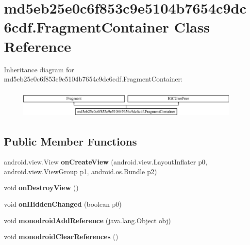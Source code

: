 \hypertarget{classmd5eb25e0c6f853c9e5104b7654c9dc6cdf_1_1FragmentContainer}{}\section{md5eb25e0c6f853c9e5104b7654c9dc6cdf.\+Fragment\+Container Class Reference}
\label{classmd5eb25e0c6f853c9e5104b7654c9dc6cdf_1_1FragmentContainer}
Inheritance diagram for md5eb25e0c6f853c9e5104b7654c9dc6cdf.\+Fragment\+Container\+:\begin{figure}[H]
\begin{center}
\leavevmode
\includegraphics[height=1.501341cm]{classmd5eb25e0c6f853c9e5104b7654c9dc6cdf_1_1FragmentContainer}
\end{center}
\end{figure}
\subsection*{Public Member Functions}
\begin{DoxyCompactItemize}
\item 
\hypertarget{classmd5eb25e0c6f853c9e5104b7654c9dc6cdf_1_1FragmentContainer_aba67b66f09672598a2d64e86fc2c267d}{}android.\+view.\+View {\bfseries on\+Create\+View} (android.\+view.\+Layout\+Inflater p0, android.\+view.\+View\+Group p1, android.\+os.\+Bundle p2)\label{classmd5eb25e0c6f853c9e5104b7654c9dc6cdf_1_1FragmentContainer_aba67b66f09672598a2d64e86fc2c267d}

\item 
\hypertarget{classmd5eb25e0c6f853c9e5104b7654c9dc6cdf_1_1FragmentContainer_a28fd8cf58a344f6c5c6990f47f105083}{}void {\bfseries on\+Destroy\+View} ()\label{classmd5eb25e0c6f853c9e5104b7654c9dc6cdf_1_1FragmentContainer_a28fd8cf58a344f6c5c6990f47f105083}

\item 
\hypertarget{classmd5eb25e0c6f853c9e5104b7654c9dc6cdf_1_1FragmentContainer_a66bcdccabab4d6f28038fc5259afd02e}{}void {\bfseries on\+Hidden\+Changed} (boolean p0)\label{classmd5eb25e0c6f853c9e5104b7654c9dc6cdf_1_1FragmentContainer_a66bcdccabab4d6f28038fc5259afd02e}

\item 
\hypertarget{classmd5eb25e0c6f853c9e5104b7654c9dc6cdf_1_1FragmentContainer_a399d8bbb6779eefbe7546686f724822b}{}void {\bfseries monodroid\+Add\+Reference} (java.\+lang.\+Object obj)\label{classmd5eb25e0c6f853c9e5104b7654c9dc6cdf_1_1FragmentContainer_a399d8bbb6779eefbe7546686f724822b}

\item 
\hypertarget{classmd5eb25e0c6f853c9e5104b7654c9dc6cdf_1_1FragmentContainer_a2a617144aa2650efff849c61d1dfde64}{}void {\bfseries monodroid\+Clear\+References} ()\label{classmd5eb25e0c6f853c9e5104b7654c9dc6cdf_1_1FragmentContainer_a2a617144aa2650efff849c61d1dfde64}

\end{DoxyCompactItemize}



